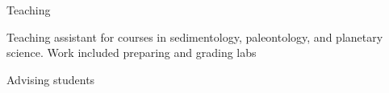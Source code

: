 \begin{cvlist}{Teaching}
\item Teaching assistant for courses in sedimentology, paleontology, and planetary science. Work included preparing and grading labs 
\item Advising students 
\end{cvlist}
